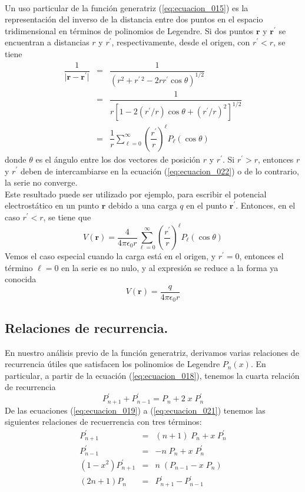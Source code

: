 \\
Un uso particular de la función generatriz (\ref{eq:ecuacion_015}) es la representación del inverso de la distancia  entre dos puntos en el espacio tridimensional en términos de polinomios de Legendre. Si dos puntos $\mathbf{r}$ y $\mathbf{r}^{\prime}$ se encuentran a distancias $r$ y $r^{\prime}$, respectivamente, desde el origen, con $r^{\prime} < r$, se tiene
\begin{eqnarray}
\dfrac{1}{\vert \mathbf{r} - \mathbf{r}^{\prime} \vert} &=& \dfrac{1}{(r^{2} + r^{\prime \: 2} - 2 r r^{\prime} \cos \theta)^{1/2}} \nonumber \\
&=& \dfrac{1}{r [ 1 -2 (r^{\prime}/r) \cos \theta + (r^{\prime}/r)^{2}]^{1/2}} \nonumber \\
&=& \dfrac{1}{r} \sum_{\ell = 0}^{\infty} \left( \dfrac{r^{\prime}}{r} \right)^{\ell} P_{\ell} (\cos \theta)
\label{eq:ecuacion_022}
\end{eqnarray}
donde $\theta$ es el ángulo entre los dos vectores de posición $r$ y $r^{\prime}$. Si $r^{\prime} > r$, entonces $r$ y $r^{\prime}$ deben de intercambiarse en la ecuación (\ref{eq:ecuacion_022}) o de lo contrario, la serie no converge.
\\
Este resultado puede ser utilizado por ejemplo, para escribir el potencial electrostático en un punto $\mathbf{r}$ debido a una carga $q$ en el punto $\mathbf{r}^{\prime}$. Entonces, en el caso $r^{\prime} < r$, se tiene que
\[ V(\mathbf{r}) =  \dfrac{4}{4 \pi \epsilon_{0} r} \sum_{\ell=0}^{\infty} \left( \dfrac{r^{\prime}}{r} \right)^{\ell} P_{\ell} (\cos \theta) \]
Vemos el caso especial cuando la carga está en el origen, y $r^{\prime} =0$, entonces el término $\ell =0$ en la serie es no nulo, y al expresión se reduce a la forma ya conocida 
\[ V(\mathbf{r}) = \frac{q}{4 \pi \epsilon_{0} r} \]
\subsection*{Relaciones de recurrencia.}
En nuestro análisis previo de la función generatriz, derivamos varias relaciones de recurrencia útiles que satisfacen los polinomios de Legendre $P_{n} (x)$. En particular, a partir de la ecuación (\ref{eq:ecuacion_018}), tenemos la cuarta relación de recurrencia
\[ P^{\prime}_{n+1} + P^{\prime}_{n-1} =  P_{n} + 2 \; x \; P^{\prime}_{n} \]
De las ecuaciones (\ref{eq:ecuacion_019}) a (\ref{eq:ecuacion_021}) tenemos las siguientes relaciones de recuerrencia con tres términos:
\begin{eqnarray}
P^{\prime}_{n+1} &=& (n+1) \; P_{n} + x \; P^{\prime}_{n} \\
P^{\prime}_{n-1} &=& -n \; P_{n} + x \; P^{\prime}_{n} \\
(1 - x^{2}) P^{\prime}_{n+1} &=& n \; (P_{n-1} - x \; P_{n}) \\
(2n+1) P_{n} &=& P^{\prime}_{n+1} - P^{\prime}_{n-1}
\end{eqnarray}
